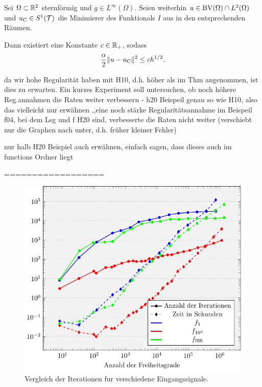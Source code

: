   \begin{theorem}
    \label{thm:errorEstimateCourant}
    Sei $\Omega\subset\mathbb{R}^2$ sternförmig und $g\in L^\infty(\Omega)$.  Seien
    weiterhin $u\in\textup{BV}(\Omega)\cap L^2(\Omega)$ und $u_{\textup{C}}\in S^1(\mathcal{T})$ die
    Minimierer des Funktionals $I$ aus  in den entsprechenden
    Räumen.
  
    Dann existiert eine Konstante $c\in\mathbb{R}_+$, sodass
    \begin{align*}
      \frac{\alpha}{2}\Vert u-u_{\textup{C}}\Vert^2\leq
      ch^{1/2}.
    \end{align*}
  \end{theorem}

  da wir hohe Regularität haben mit H10, d.h. höher als im Thm angenommen, ist
  dies zu erwarten. Ein kurzes Experiment soll untersuchen, ob noch höhere 
  Reg.annahmen die Raten weiter verbessern
  - h20 Beispeil genau so wie H10, also das vielleicht nur erwähnen ,,eine 
    noch stärke Regularitätsannahme im Beispeil f04, bei dem Lsg und f H20 sind,
    verbesserte die Raten nicht weiter (verschiebt nur die Graphen nach unter,
    d.h. früher kleiner Fehler)

  nur halb H20 Beispiel auch erwähnen, einfach sagen, dass dieses auch im 
  functions Ordner liegt

  
==================

\begin{figure}[p]
  \centering
  \includegraphics[width=\linewidth]
    {pictures/chapExperiments/secExactSol/nrIterComp/miscF.pdf}
  \caption{Vergleich der Iterationen fur verschiedene Eingangssignale.}
  \label{fig:inSiNrIterComparison}
\end{figure}

